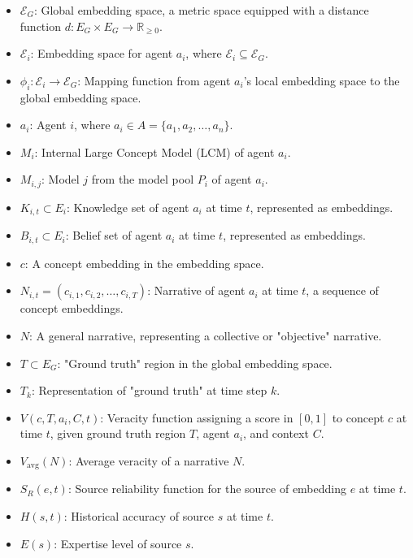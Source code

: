 \documentclass[12pt, a4paper]{article}
\begin{document}
\begin{itemize}
    \item  \( \mathcal{E}_G \): Global embedding space, a metric space equipped with a distance function \( d: E_G \times E_G \rightarrow \mathbb{R}_{\geq 0} \).
    \item \( \mathcal{E}_i \): Embedding space for agent \( a_i \), where \( \mathcal{E}_i \subseteq \mathcal{E}_G \).
    \item \( \phi_i: \mathcal{E}_i \rightarrow \mathcal{E}_G \): Mapping function from agent \( a_i \)'s local embedding space to the global embedding space.
    \item \( a_i \): Agent \( i \), where \( a_i \in A = \{a_1, a_2, \dots, a_n\} \).
    \item \( M_i \): Internal Large Concept Model (LCM) of agent \( a_i \).
    \item \( M_{i,j} \): Model \(j\) from the model pool \(P_i\) of agent \( a_i \).
    \item \( K_{i,t} \subset E_i \): Knowledge set of agent \( a_i \) at time \( t \), represented as embeddings.
    \item \( B_{i,t} \subset E_i \): Belief set of agent \( a_i \) at time \( t \), represented as embeddings.
    \item \( c \): A concept embedding in the embedding space.
    \item \( N_{i,t} = (c_{i,1}, c_{i,2}, \dots, c_{i,T}) \): Narrative of agent \( a_i \) at time \( t \), a sequence of concept embeddings.
    \item \( N \): A general narrative, representing a collective or "objective" narrative.
    \item \( T \subset E_G \): "Ground truth" region in the global embedding space.
    \item \( T_k \): Representation of "ground truth" at time step \(k\).
    \item \( V(c, T, a_i, C, t) \): Veracity function assigning a score in \([0, 1]\) to concept \( c \) at time \(t\), given ground truth region \( T \), agent \( a_i \), and context \( C \).
    \item \( V_{\text{avg}}(N) \): Average veracity of a narrative \( N \).
    \item \( S_R(e,t) \): Source reliability function for the source of embedding \(e\) at time \(t\).
    \item \( H(s,t) \): Historical accuracy of source \(s\) at time \(t\).
    \item \( E(s) \): Expertise level of source \(s\).

\end{itemize}
\end{document}
